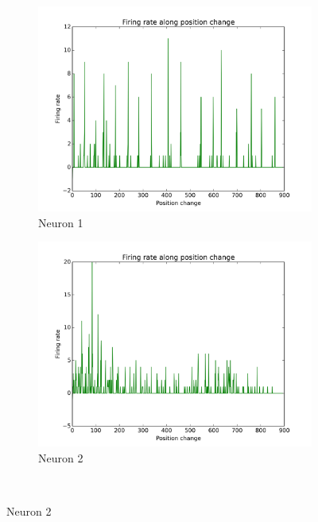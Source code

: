 \documentclass[12pt,a4paper,twocolumn]{article}
\begin{document}
\begin{figure}[htbp]
  \begin{subfigure}{.49\linewidth}\centering
    \includegraphics[width=1.1\textwidth]{figure2.png}
    \caption{Neuron 1\label{fig:FiringPosition_N1}}
  \end{subfigure}
  \begin{subfigure}{.49\linewidth}\centering
    \includegraphics[width=1.1\textwidth]{figure3.png}
    \caption{Neuron 2\label{fig:FiringPosition_N2}}
  \end{subfigure}\\[1ex]


\end{figure}
\end{document}
